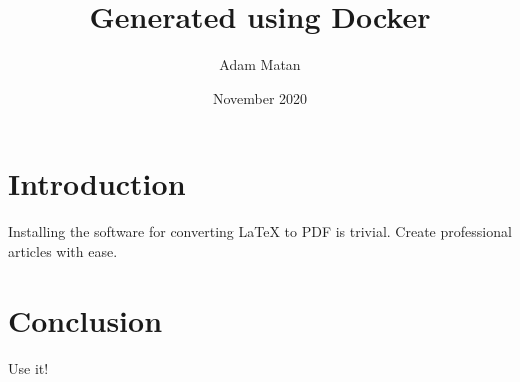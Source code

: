 \documentclass{article}
\title{Generated using Docker}
\author{Adam Matan}
\date{November 2020}
\begin{document}
\maketitle

\section{Introduction}
Installing the software for converting LaTeX to PDF is trivial. Create professional articles with ease.

\section{Conclusion}
Use it!
\end{document}
